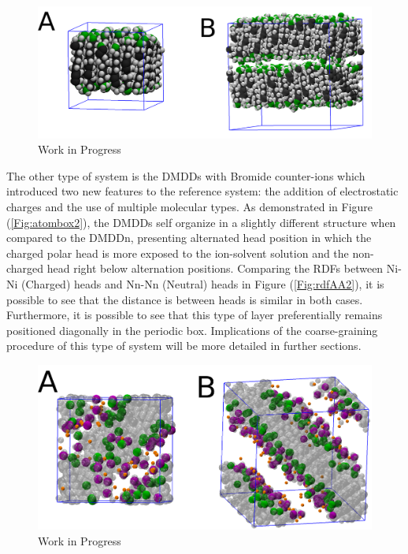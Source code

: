 \documentclass[10pt,a4paper,twoside]{article}
\begin{document}
\begin{figure}[H]
  \begin{center}
	\includegraphics[width=1 \textwidth]{./images/aa1}
	\caption{Work in Progress}
	\label{Fig:aa1}
  \end{center}
\end{figure}

The other type of system is the DMDDs with Bromide counter-ions which introduced two new features to the reference system: the addition of electrostatic charges and the use of multiple molecular types. As demonstrated in Figure (\ref{Fig:atombox2}), the DMDDs self organize in a slightly different structure when compared to the DMDDn, presenting alternated head position in which the charged polar head is more exposed to the ion-solvent solution and the non-charged head right below alternation positions. Comparing the RDFs between Ni-Ni (Charged) heads and Nn-Nn (Neutral)  heads in Figure (\ref{Fig:rdfAA2}), it is possible to see that the distance is between heads is similar in both cases. Furthermore, it is possible to see that this type of layer preferentially remains positioned diagonally in the periodic box. Implications of the coarse-graining procedure of this type of system will be more detailed in further sections.

\begin{figure}[H]
  \begin{center}
	\includegraphics[width=1 \textwidth]{./images/aa2}
	\caption{Work in Progress}
	\label{Fig:aa2}
  \end{center}
\end{figure}
\end{document}
